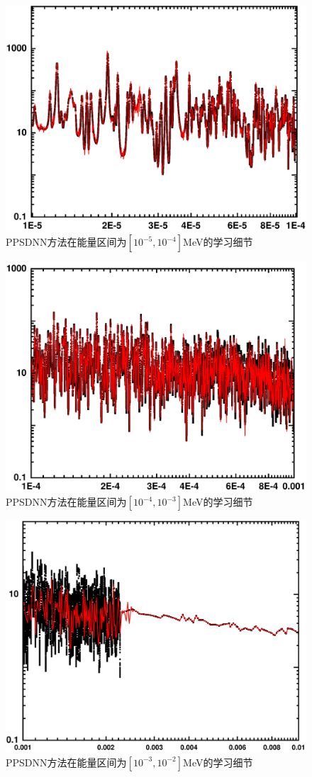 \begin{figure}[htbp!]
  \centering
  \includegraphics[width=0.84\linewidth]{figures/endftrain/G5.pdf}
  \caption{PPSDNN方法在能量区间为$[10^{-5},10^{-4}]$MeV的学习细节}
  \label{endf5}
\end{figure}
\begin{figure}[htbp!]
  \centering
  \includegraphics[width=0.84\linewidth]{figures/endftrain/G4.pdf}
  \caption{PPSDNN方法在能量区间为$[10^{-4},10^{-3}]$MeV的学习细节}
  \label{endf4}
\end{figure}
\begin{figure}[htbp!]
  \centering
  \includegraphics[width=0.84\linewidth]{figures/endftrain/G3.pdf}
  \caption{PPSDNN方法在能量区间为$[10^{-3},10^{-2}]$MeV的学习细节}
  \label{endf3}
\end{figure}
